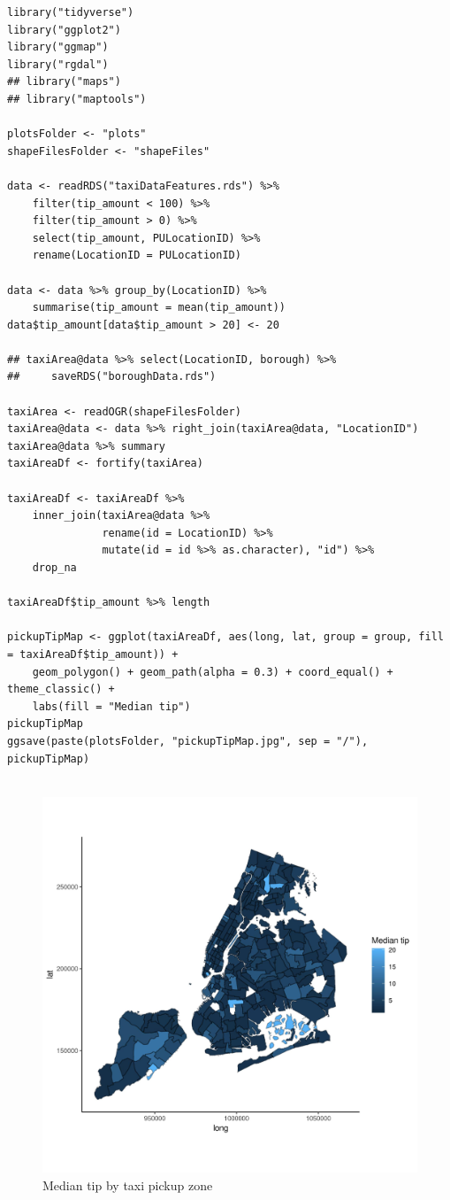 \documentclass[11pt]{article}
\begin{document}
\begin{verbatim}
library("tidyverse")
library("ggplot2")
library("ggmap")
library("rgdal")
## library("maps")
## library("maptools")

plotsFolder <- "plots"
shapeFilesFolder <- "shapeFiles"

data <- readRDS("taxiDataFeatures.rds") %>%
    filter(tip_amount < 100) %>%
    filter(tip_amount > 0) %>%
    select(tip_amount, PULocationID) %>%
    rename(LocationID = PULocationID)

data <- data %>% group_by(LocationID) %>%
    summarise(tip_amount = mean(tip_amount))
data$tip_amount[data$tip_amount > 20] <- 20

## taxiArea@data %>% select(LocationID, borough) %>%
##     saveRDS("boroughData.rds")

taxiArea <- readOGR(shapeFilesFolder)
taxiArea@data <- data %>% right_join(taxiArea@data, "LocationID")
taxiArea@data %>% summary
taxiAreaDf <- fortify(taxiArea)

taxiAreaDf <- taxiAreaDf %>%
    inner_join(taxiArea@data %>%
               rename(id = LocationID) %>%
               mutate(id = id %>% as.character), "id") %>%
    drop_na

taxiAreaDf$tip_amount %>% length

pickupTipMap <- ggplot(taxiAreaDf, aes(long, lat, group = group, fill = taxiAreaDf$tip_amount)) +
    geom_polygon() + geom_path(alpha = 0.3) + coord_equal() + theme_classic() +
    labs(fill = "Median tip")
pickupTipMap
ggsave(paste(plotsFolder, "pickupTipMap.jpg", sep = "/"), pickupTipMap)


\end{verbatim}

\begin{figure}[htbp]
\centering
\includegraphics[width=.9\linewidth]{./plots/pickupTipMap.jpg}
\caption{\label{fig:org0de4c37}
Median tip by taxi pickup zone}
\end{figure}
\end{document}

